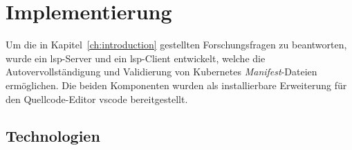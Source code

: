 \chapter{Implementierung}\label{ch:implementation}

Um die in Kapitel~\ref{ch:introduction} gestellten Forschungsfragen zu beantworten, wurde ein \ac{lsp}-Server und ein \ac{lsp}-Client entwickelt,
welche die Autovervollständigung und Validierung von Kubernetes \textit{Manifest}-Dateien ermöglichen.
Die beiden Komponenten wurden als installierbare Erweiterung für den Quellcode-Editor \ac{vscode} bereitgestellt.

\section{Technologien}

